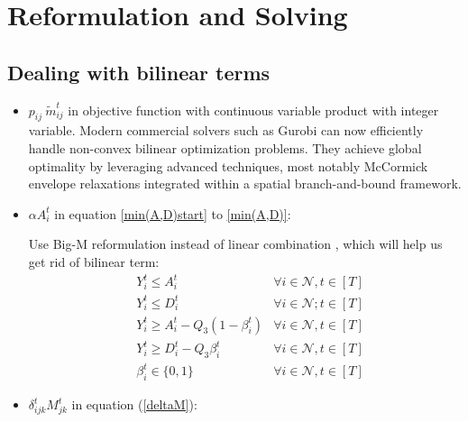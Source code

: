 \documentclass[trsc,nonblindrev]{informs3noheader}
\begin{document}
\section{Reformulation and Solving}

\subsection{Dealing with bilinear terms}

\begin{itemize} 
    \item $ p_{ij}\ \tilde{m}_{ij}^t$ in objective function with continuous variable product with integer variable. Modern commercial solvers such as Gurobi can now efficiently handle non-convex bilinear optimization problems. They achieve global optimality by leveraging advanced techniques, most notably McCormick envelope relaxations integrated within a spatial branch-and-bound framework.\citep{gurobi_manual_current, gurobi_miqcp_2020}
    \item $\alpha A_{i}^t$ in equation \eqref{min(A,D)start} to \eqref{min(A,D)}:
    
    Use Big-M reformulation instead of linear combination \citep{glover1975improved}, which will help us get rid of bilinear term:
\begin{subequations}
    \begin{align}
    & Y_i^t \leq A_{i}^t & \forall i\in \mathcal{N},  t\in [T]\label{2a}\\[4pt]
    &  Y_i^t \leq D_{i}^t & \forall i\in \mathcal{N}; t\in [T]\\[4pt]
    & Y_i^t \geq  A_i^t - Q_3 (1-\beta_i^t) & \forall i\in \mathcal{N},t\in [T]\\
    & Y_i^t \geq  D_i^t - Q_3 \beta_i^t & \forall i\in \mathcal{N},t\in [T]\\
    & \beta_i^t \in \{0,1\} & \forall i\in \mathcal{N}, t\in [T]\label{2e}
    \end{align}
\end{subequations}
    \item $\delta_{ijk}^tM_{jk}^t$ in equation (\ref{deltaM}):
    

\end{itemize}
\end{document}
